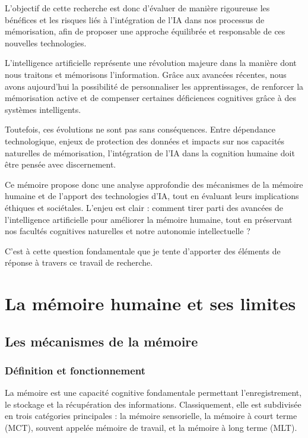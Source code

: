 \documentclass[12pt,a4paper]{report}
\begin{document}
L’objectif de cette recherche est donc d’évaluer de manière rigoureuse les bénéfices et les risques liés à l’intégration de l’IA dans nos processus de mémorisation, afin de proposer une approche équilibrée et responsable de ces nouvelles technologies.

L’intelligence artificielle représente une révolution majeure dans la manière dont nous traitons et mémorisons l’information. Grâce aux avancées récentes, nous avons aujourd’hui la possibilité de personnaliser les apprentissages, de renforcer la mémorisation active et de compenser certaines déficiences cognitives grâce à des systèmes intelligents.

Toutefois, ces évolutions ne sont pas sans conséquences. Entre dépendance technologique, enjeux de protection des données et impacts sur nos capacités naturelles de mémorisation, l’intégration de l’IA dans la cognition humaine doit être pensée avec discernement.

Ce mémoire propose donc une analyse approfondie des mécanismes de la mémoire humaine et de l’apport des technologies d’IA, tout en évaluant leurs implications éthiques et sociétales. L’enjeu est clair : comment tirer parti des avancées de l’intelligence artificielle pour améliorer la mémoire humaine, tout en préservant nos facultés cognitives naturelles et notre autonomie intellectuelle ?

C’est à cette question fondamentale que je tente d’apporter des éléments de réponse à travers ce travail de recherche.



\chapter{La mémoire humaine et ses limites}
\section{Les mécanismes de la mémoire}
\subsection{Définition et fonctionnement}
La mémoire est une capacité cognitive fondamentale permettant l'enregistrement, le stockage et la récupération des informations. Classiquement, elle est subdivisée en trois catégories principales : la mémoire sensorielle, la mémoire à court terme (MCT), souvent appelée mémoire de travail, et la mémoire à long terme (MLT).
\end{document}
